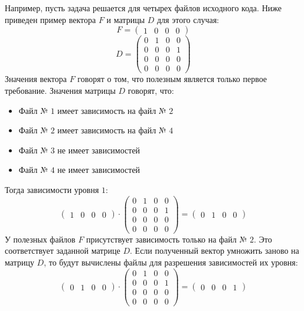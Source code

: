 Например, пусть задача решается для четырех файлов исходного кода. Ниже приведен пример вектора $F$ и матрицы $D$ для этого случая:
\begin{equation}
  F = \begin{pmatrix}
  1 & 0 & 0 & 0 
 \end{pmatrix}
\end{equation}
\begin{equation}
  D = \begin{pmatrix}
  0 & 1 & 0 & 0 \\
  0 & 0 & 0 & 1 \\
  0 & 0 & 0 & 0 \\
  0 & 0 & 0 & 0 
 \end{pmatrix}
\end{equation}
Значения вектора $F$ говорят о том, что полезным является только первое требование. Значения матрицы $D$ говорят, что:
\begin{itemize}
  \item Файл № $1$ имеет зависимость на файл № $2$
  \item Файл № $2$ имеет зависимость на файл № $4$
  \item Файл № $3$ не имеет зависимостей
  \item Файл № $4$ не имеет зависимостей
\end{itemize}
Тогда зависимости уровня $1$:
\begin{equation}
  \begin{pmatrix}
  1 & 0 & 0 & 0 
 \end{pmatrix}
 \cdot
 \begin{pmatrix}
  0 & 1 & 0 & 0 \\
  0 & 0 & 0 & 1 \\
  0 & 0 & 0 & 0 \\
  0 & 0 & 0 & 0 
 \end{pmatrix}
 = 
 \begin{pmatrix}
  0 & 1 & 0 & 0 
 \end{pmatrix}
\end{equation}
У полезных файлов $F$ присутствует зависимость только на файл № $2$. Это соответствует заданной матрице $D$. Если полученный вектор умножить заново на матрицу $D$, то будут вычислены файлы для разрешения зависимостей их уровня:
\begin{equation}
  \begin{pmatrix}
  0 & 1 & 0 & 0 
  \end{pmatrix}
  \cdot
  \begin{pmatrix}
  0 & 1 & 0 & 0 \\
  0 & 0 & 0 & 1 \\
  0 & 0 & 0 & 0 \\
  0 & 0 & 0 & 0 
 \end{pmatrix}
 = 
 \begin{pmatrix}
  0 & 0 & 0 & 1 
 \end{pmatrix}
\end{equation}

